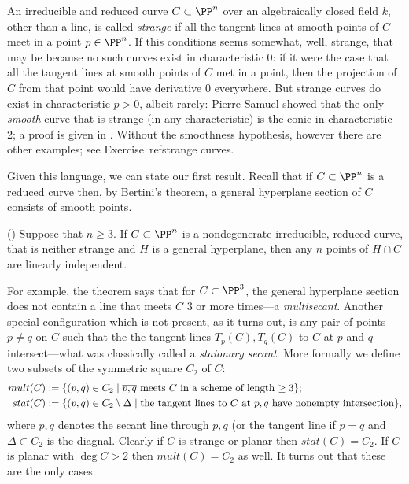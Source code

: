 An irreducible and reduced curve
$C\subset \PP^n$ over an algebraically closed field $k$, other than a line, is called \emph{strange} if
all the tangent lines at smooth points of $C$ meet in a point $p\in \PP^n$. If this conditions seems somewhat, well, strange, that may be because no such curves exist in characteristic 0: if it were the case that all the tangent lines at smooth points of $C$ met in a point, then the projection of $C$ from that point would have derivative 0 everywhere. But strange curves do exist in characteristic $p > 0$, albeit rarely: Pierre Samuel showed that the only \emph{smooth} curve that is strange (in any characteristic) is the conic in characteristic 2; a proof is given in \cite[Theorem IV.3.9]{Hartshorne1977}. Without the smoothness hypothesis, however there are other examples; see Exercise~ref{strange curves}.

Given this language, we can state our first result. Recall that if $C\subset \PP^n$ is a reduced curve then, by Bertini's theorem, a general hyperplane
section of $C$ consists of smooth points. 

\begin{theorem} \label{basic linear independence}(\cite[Lemma 1.1]{Rathmann})\label{linear general position}
Suppose that $n\geq 3$. If $C\subset \PP^n$ is a nondegenerate irreducible, reduced curve, that is neither strange
and $H$ is a general hyperplane, then any $n$ points of $H\cap C$ are
linearly independent.
\end{theorem}

For example, the theorem says that for $C \subset \PP^3$, the general hyperplane section does not contain a line
that meets $C$ 3 or more times---a \emph{multisecant}. Another special configuration which is not present, as it turns out,
is any pair of points $p\neq q$ on $C$ such that the the tangent lines $T_p(C), T_q(C)$ to $C$ at $p$ and $q$ intersect---what was classically
called a \emph{staionary secant}. More formally we define two subsets of the symmetric square $C_2$ of $C$:
$$
\begin{aligned}
 mult(C) &:=\{(p,q) \in C_2 \mid \overline{p,q} \hbox{ meets $C$ in a scheme of length $\geq 3$}\};\\
stat(C) &:= \{(p,q) \in C_2\setminus \Delta \mid  \hbox{the tangent lines to $C$ at $p,q$ have nonempty intersection}\},
\end{aligned}
$$
where $\overline{p,q}$ denotes the secant line through $p,q$ (or the tangent line if $p=q$ and $\Delta\subset C_2$
is the diagnal.
Clearly if $C$ is strange or planar then $stat(C) = C_2$. If $C$ is planar with $\deg C>2$ then $mult(C) = C_2$ as well.
It turns out that these are the only cases:

